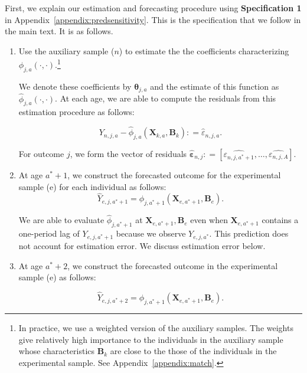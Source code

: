 \noindent First, we explain our estimation and forecasting procedure using \textbf{Specification 1} in Appendix~\ref{appendix:predsensitivity}. This is the specification that we follow in the main text. It is as follows.

\begin{enumerate}
\item Use the auxiliary sample ($n$) to estimate the the coefficients characterizing $\phi_{j,a} \left( \cdot , \cdot \right)$.\footnote{In practice, we use a weighted version of the auxiliary samples. The weights give relatively high importance to the individuals in the auxiliary sample whose characteristics $\bm{B}_k$ are close to the those of the individuals in the experimental sample. See Appendix~\ref{appendix:match}.}

We denote these coefficients by $\bm{\theta}_{j,a}$ and the estimate of this function as $\hat{\phi}_{j,a} \left( \cdot , \cdot \right)$. At each age, we are able to compute the residuals from this estimation procedure as follows:

\begin{equation}
Y_{n,j,a} -  \hat{\phi}_{j,a} (\bm{X}_{k,a}, \bm{B}_k) : = \hat{\varepsilon}_{n,j,a}.
\end{equation}

For outcome $j$, we form the vector of residuals $\hat{\bm{\varepsilon}}_{n,j} : = \left[ \hat{\varepsilon_{n,j,a^*+1}}, \ldots, \hat{\varepsilon_{n,j,A}} \right]$.

\item At age $a^*+1$, we construct the forecasted outcome for the experimental sample (e) for each individual as follows:
\begin{equation}
\hat{Y}_{e,j,a^*+1} = \hat{\phi}_{j,a^*+1} \left( \bm{X}_{e,a^*+1}, \bm{B}_e \right).
\end{equation}

\noindent We are able to evaluate $\hat{\phi}_{j,a^*+1}$ at $ \bm{X}_{e,a^*+1}, \bm{B}_e $ even when $\bm{X}_{e,a^*+1}$ contains a one-period lag of $Y_{e,j,a^*+1}$ because we observe $Y_{e,j,a^*}$. This prediction does not account for estimation error. We discuss estimation error below.

\item At age $a^*+2$, we construct the forecasted outcome in the experimental sample (e) as follows:

\begin{equation}
\hat{Y}_{e,j,a^*+2} = \hat{\phi}_{j,a^*+1} \left( \bm{X}_{e,a^*+1}, \bm{B}_e \right).
\end{equation}


\end{enumerate}
